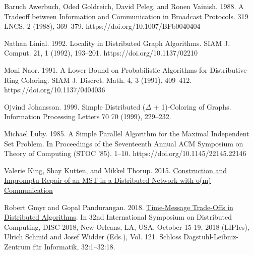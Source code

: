\documentclass[11pt]{article}
\begin{document}
\begin{thebibliography}{9}
Baruch Awerbuch, Oded Goldreich, David Peleg, and Ronen Vainish. 1988. A Tradeoff between Information and Communication in Broadcast
Protocols. 319 LNCS, 2 (1988), 369–379. https://doi.org/10.1007/BFb0040404

Nathan Linial. 1992. Locality in Distributed Graph Algorithms. SIAM J. Comput. 21, 1 (1992), 193–201. https://doi.org/10.1137/02210

Moni Naor. 1991. A Lower Bound on Probabilistic Algorithms for Distributive Ring Coloring. SIAM J. Discret. Math. 4, 3 (1991), 409–412. https://doi.org/10.1137/0404036

Ojvind Johansson. 1999. Simple Distributed ($\Delta$ + 1)-Coloring of Graphs. Information Processing Letters 70 70 (1999), 229–232.

 Michael Luby. 1985. A Simple Parallel Algorithm for the Maximal Independent Set Problem. In Proceedings of the Seventeenth Annual ACM Symposium on Theory of Computing (STOC ’85). 1–10. https://doi.org/10.1145/22145.22146

 Valerie King, Shay Kutten, and Mikkel Thorup. 2015. \href{https://doi.org/10.1145/2767386.2767405}{Construction and Impromptu Repair of an MST in a Distributed Network with o(m) Communication}

Robert Gmyr and Gopal Pandurangan. 2018. \href{https://doi.org/10.4230/LIPIcs.DISC.2018.32}{Time-Message Trade-Offs in Distributed Algorithms}. In 32nd International Symposium on Distributed Computing, DISC 2018, New Orleans, LA, USA, October 15-19, 2018 (LIPIcs), Ulrich Schmid and Josef Widder (Eds.), Vol. 121. Schloss Dagstuhl-Leibniz-Zentrum für Informatik, 32:1–32:18. 
\end{thebibliography}
    
\end{document}
